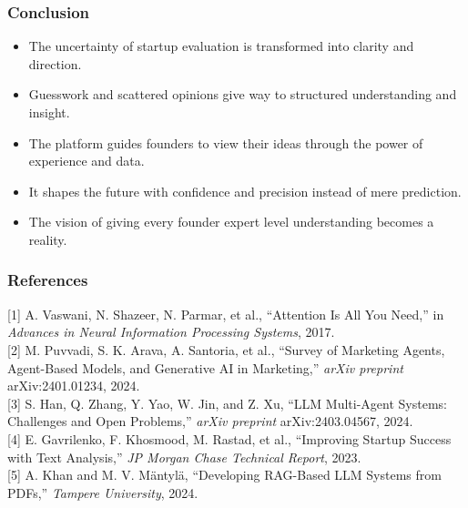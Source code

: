 \documentclass{beamer}
\begin{document}
\begin{frame}
\frametitle{Conclusion}
\begin{itemize}
   \item The uncertainty of startup evaluation is transformed into clarity and direction.
\item Guesswork and scattered opinions give way to structured understanding and insight.
\item The platform guides founders to view their ideas through the power of experience and data.
\item  It shapes the future with confidence and precision instead of mere prediction.
\item  The vision of giving every founder expert level understanding becomes a reality.


\end{itemize}
\end{frame}

\begin{frame}
\frametitle{References}
\footnotesize{

[1] A. Vaswani, N. Shazeer, N. Parmar, et al., “Attention Is All You Need,” in \textit{Advances in Neural Information Processing Systems}, 2017. \\

[2] M. Puvvadi, S. K. Arava, A. Santoria, et al., “Survey of Marketing Agents, Agent-Based Models, and Generative AI in Marketing,” \textit{arXiv preprint} arXiv:2401.01234, 2024. \\

[3] S. Han, Q. Zhang, Y. Yao, W. Jin, and Z. Xu, “LLM Multi-Agent Systems: Challenges and Open Problems,” \textit{arXiv preprint} arXiv:2403.04567, 2024. \\

[4] E. Gavrilenko, F. Khosmood, M. Rastad, et al., “Improving Startup Success with Text Analysis,” \textit{JP Morgan Chase Technical Report}, 2023. \\

[5] A. Khan and M. V. Mäntylä, “Developing RAG-Based LLM Systems from PDFs,” \textit{Tampere University}, 2024. \\
}
\end{frame}
\end{document}
